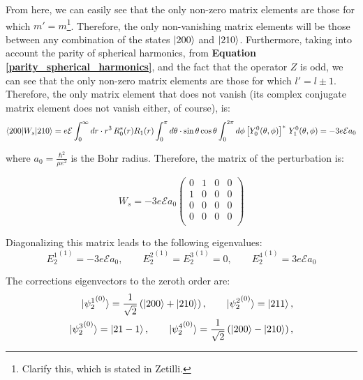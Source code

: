 From here, we can easily see that the only non-zero matrix elements are those for which $m' = m$\footnote{Clarify this, which is stated in Zetilli.}. Therefore, the only non-vanishing matrix elements will be those between any combination of the states $\ket{200}$ and $\ket{210}$. Furthermore, taking into account the parity of spherical harmonics, from \textbf{Equation \ref{parity_spherical_harmonics}}, and the fact that the operator $Z$ is odd, we can see that the only non-zero matrix elements are those for which $l' = l\pm 1$. Therefore, the only matrix element that does not vanish (its complex conjugate matrix element does not vanish either, of course), is:
\begin{equation}
    \begin{split}
        \braket{200|W_s|210} &= e\mathcal{E} \int_{0}^{\infty}dr\cdot r^3\, R_0^*(r)R_1(r)\int_{0}^{\pi}d\theta\cdot \sin\theta\cos\theta\int_{0}^{2\pi}d\phi \left[Y_0^0(\theta, \phi)\right]^*\, Y_1^0(\theta, \phi) = -3e\mathcal{E}a_0\\
    \end{split}
\end{equation}

where $a_0 = \frac{\hbar^2}{\mu e^2}$ is the Bohr radius. Therefore, the matrix of the perturbation is:

\begin{equation}
    W_s = -3e\mathcal{E}a_0\begin{pmatrix}
        0 & 1 & 0 & 0 \\
        1 & 0 & 0 & 0 \\
        0 & 0 & 0 & 0 \\
        0 & 0 & 0 & 0 \\
    \end{pmatrix}
\end{equation}

Diagonalizing this matrix leads to the following eigenvalues:
\begin{equation}
    {E_2^1}^{(1)} = -3e\mathcal{E}a_0,\qquad {E_2^2}^{(1)} = {E_2^3}^{(1)} = 0, \qquad {E_2^4}^{(1)} = 3e\mathcal{E}a_0
\end{equation}

The corrections eigenvectors to the zeroth order are:
\begin{equation}
    \begin{split}
        \ket{{\psi_2^1}^{(0)}} = \frac{1}{\sqrt{2}} \left(\ket{200} + \ket{210}\right), \qquad \ket{{\psi_2^2}^{(0)}} = \ket{211},\\
        \ket{{\psi_2^3}^{(0)}} = \ket{21-1}, \qquad \ket{{\psi_2^4}^{(0)}} = \frac{1}{\sqrt{2}} \left(\ket{200} - \ket{210}\right),\\
    \end{split}
\end{equation}

